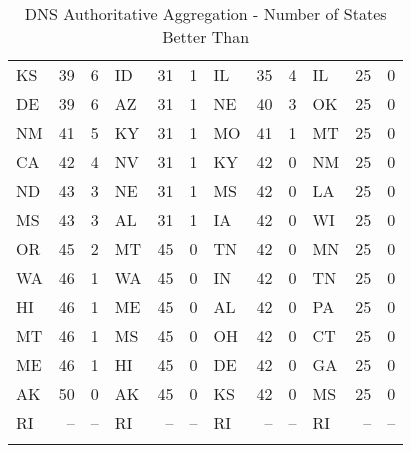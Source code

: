\begin{longtable}{lrr|lrr||lrr|lrr}
        KS &   39 &             6 &            ID &   31 &             1 &             IL &   35 &             4 &            IL &   25 &             0 \\
        DE &   39 &             6 &            AZ &   31 &             1 &             NE &   40 &             3 &            OK &   25 &             0 \\
        NM &   41 &             5 &            KY &   31 &             1 &             MO &   41 &             1 &            MT &   25 &             0 \\
        CA &   42 &             4 &            NV &   31 &             1 &             KY &   42 &             0 &            NM &   25 &             0 \\
        ND &   43 &             3 &            NE &   31 &             1 &             MS &   42 &             0 &            LA &   25 &             0 \\
        MS &   43 &             3 &            AL &   31 &             1 &             IA &   42 &             0 &            WI &   25 &             0 \\
        OR &   45 &             2 &            MT &   45 &             0 &             TN &   42 &             0 &            MN &   25 &             0 \\
        WA &   46 &             1 &            WA &   45 &             0 &             IN &   42 &             0 &            TN &   25 &             0 \\
        HI &   46 &             1 &            ME &   45 &             0 &             AL &   42 &             0 &            PA &   25 &             0 \\
        MT &   46 &             1 &            MS &   45 &             0 &             OH &   42 &             0 &            CT &   25 &             0 \\
        ME &   46 &             1 &            HI &   45 &             0 &             DE &   42 &             0 &            GA &   25 &             0 \\
        AK &   50 &             0 &            AK &   45 &             0 &             KS &   42 &             0 &            MS &   25 &             0 \\
        RI &   -- &            -- &            RI &   -- &            -- &             RI &   -- &            -- &            RI &   -- &            -- \\


        \caption{DNS Authoritative Aggregation - Number of States Better Than}
        \label{tab:dns_auth_agg_better_than}
\end{longtable}
